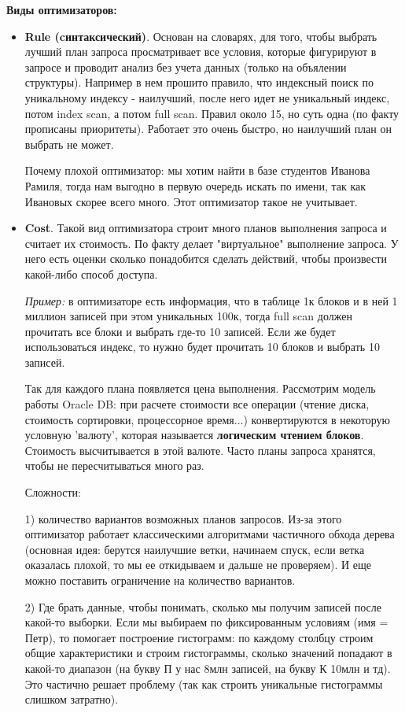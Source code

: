 \textbf{Виды оптимизаторов:} 
\begin{itemize}
    \item \textbf{Rule (cинтаксический)}. Основан на словарях, для того, чтобы выбрать лучший план запроса просматривает все условия, которые фигурируют в запросе и проводит анализ без учета данных (только на объялении структуры). Например в нем прошито правило, что индексный поиск по уникальному индексу - наилучший, после него идет не уникальный индекс, потом index scan, а потом full scan. Правил около 15, но суть одна (по факту прописаны приоритеты). Работает это очень быстро, но наилучший план он выбрать не может.
    
Почему плохой оптимизатор: мы хотим найти в базе студентов Иванова Рамиля, тогда нам выгодно в первую очередь искать по имени, так как Ивановых скорее всего много. Этот оптимизатор такое не учитывает. 

\item \textbf{Cost}. Такой вид оптимизатора строит много планов выполнения запроса и считает их стоимость. По факту делает "виртуальное" выполнение запроса. У него есть оценки сколько понадобится сделать действий, чтобы произвести какой-либо способ доступа. 
    
\textit{Пример:} в оптимизаторе есть информация, что в таблице 1к блоков и в ней 1 миллион записей при этом уникальных 100к, тогда full scan должен прочитать все блоки и выбрать где-то 10 записей. Если же будет использоваться индекс, то нужно будет прочитать 10 блоков и выбрать 10 записей. 
    
Так для каждого плана появляется цена выполнения. Рассмотрим модель работы Oracle DB: при расчете стоимости все операции (чтение диска, стоимость сортировки, процессорное время...) конвертируются в некоторую условную 'валюту', которая называется \textbf{логическим чтением блоков}. Стоимость высчитывается в этой валюте. Часто планы запроса хранятся, чтобы не пересчитываться много раз. 
    
Сложности: 
    
1) количество вариантов возможных планов запросов. Из-за этого оптимизатор работает классическими алгоритмами частичного обхода дерева (основная идея: берутся наилучшие ветки, начинаем спуск, если ветка оказалась плохой, то мы ее откидываем и дальше не проверяем). И еще можно поставить ограничение на количество вариантов. 
    
2) Где брать данные, чтобы понимать, сколько мы получим записей после какой-то выборки. Если мы выбираем по фиксированным условиям (имя = Петр), то помогает построение гистограмм: по каждому столбцу строим общие характеристики и строим гистограммы, сколько значений попадают в какой-то диапазон (на букву П у нас 8млн записей, на букву К 10млн и тд). Это частично решает проблему (так как строить уникальные гистограммы слишком затратно). 
    

\end{itemize}
